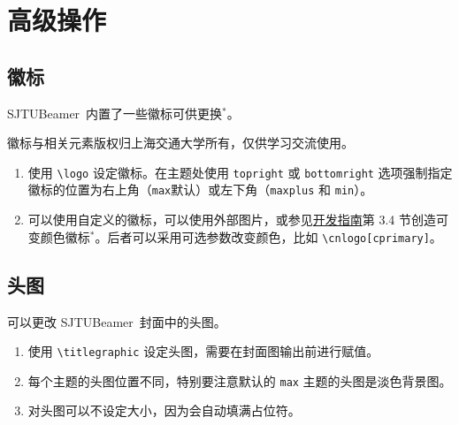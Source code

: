 \documentclass[
    UTF8,
    heading=true,
    12pt,
    a4paper
]{ctexrep}
\newenvironment{commentlist}{\begin{enumerate}\small}{\end{enumerate}}
\def\themename{\textsf{SJTUBeamer}}
\begin{document}
\part{高级操作}
\chapter{徽标}

\themename\ 内置了一些徽标可供更换$^*$。

\faInfoCircle 徽标与相关元素版权归上海交通大学所有，仅供学习交流使用。

\begin{tcbitemize}[raster rows=2, raster columns=3, raster every box/.style={center title, valign=center, halign=center,fonttitle=\ttfamily,colback=white}]
  \tcbitem[raster multicolumn=2,blankest]
  \begin{tcbitemize}[raster columns=2]
    \tcbitem[title={\textbackslash{}cnlogo}] \moveleft 0.3cm\hbox{\resizebox{!}{1cm}{\cnlogo}}
    \tcbitem[title={\textbackslash{}enlogo}] \moveleft 0.3cm\hbox{\resizebox{!}{1cm}{\enlogo}}
    \tcbitem[title={\textbackslash{}sjtubadge},height=3.5cm] \resizebox{!}{2cm}{\sjtubadge\ }
    \tcbitem[title={\textbackslash{}dlogo},height=3.5cm] \resizebox{3cm}{!}{\dlogo\ }
  \end{tcbitemize}
  \tcbitem[title={\textbackslash{}vlogo}] \resizebox{!}{4.8cm}{\vlogo\ }
\end{tcbitemize}


\begin{commentlist}
  \item 使用 \texttt{\textbackslash{}logo} 设定徽标。在主题处使用 \verb"topright" 或 \verb"bottomright" 选项强制指定徽标的位置为右上角（\verb"max"默认）或左下角（\verb"maxplus" 和 \verb"min"）。
  \item 可以使用自定义的徽标，可以使用外部图片，或参见\href{run:sjtubeamerdevguide.pdf}{开发指南}第 3.4 节创造可变颜色徽标$^*$。后者可以采用可选参数改变颜色，比如 \texttt{\textbackslash{}cnlogo[cprimary]}。
\end{commentlist}

\chapter{头图}

可以更改 \themename\ 封面中的头图。


\begin{commentlist}
  \item 使用 \texttt{\textbackslash{}titlegraphic} 设定头图，需要在封面图输出前进行赋值。
  \item 每个主题的头图位置不同，特别要注意默认的 \texttt{max} 主题的头图是淡色背景图。
  \item 对头图可以不设定大小，因为会自动填满占位符。
\end{commentlist}
\end{document}
